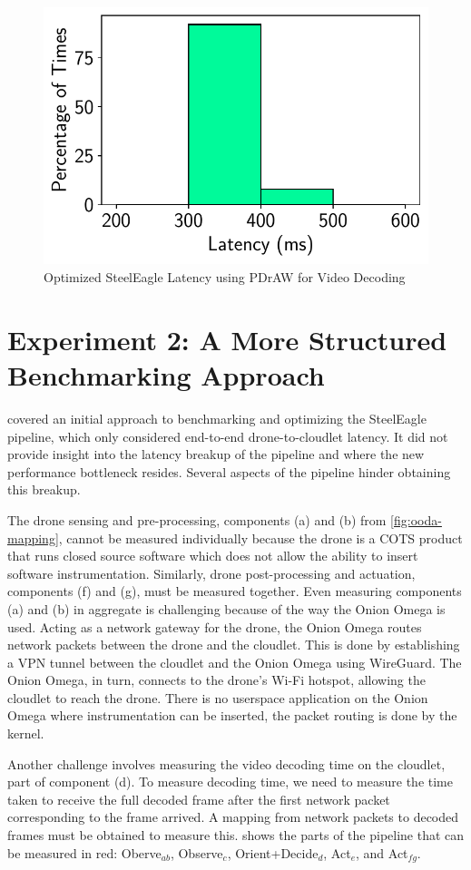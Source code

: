 \begin{figure}[htbp]
\centerline{\includegraphics[width = .4\textwidth]{figs/pdraw_latency.pdf}}
\caption{Optimized SteelEagle Latency using PDrAW for Video Decoding}
\label{fig:steeleagle_optimized_latency}
\end{figure}

\section{Experiment 2: A More Structured Benchmarking Approach}
\label{sec:exp2}

 covered an initial approach to benchmarking and optimizing the
SteelEagle pipeline, which only considered end-to-end drone-to-cloudlet
latency. It did not provide insight into the latency breakup of the pipeline
and where the new performance bottleneck resides. Several aspects of the
pipeline hinder obtaining this breakup.

The drone sensing and pre-processing, components (a) and (b) from
\cref{fig:ooda-mapping}, cannot be measured individually because the drone is a
COTS product that runs closed source software which does not allow the ability
to insert software instrumentation.  Similarly, drone post-processing and
actuation, components (f) and (g), must be measured together. Even measuring
components (a) and (b) in aggregate is challenging because of the way the Onion
Omega is used. Acting as a network gateway for the drone, the Onion Omega
routes network packets between the drone and the cloudlet. This is done by
establishing a VPN tunnel between the cloudlet and the Onion Omega using
WireGuard. The Onion Omega, in turn, connects to the drone's Wi-Fi hotspot,
allowing the cloudlet to reach the drone. There is no userspace application on
the Onion Omega where instrumentation can be inserted, the packet routing is
done by the kernel.

Another challenge involves measuring the video decoding time on the cloudlet,
part of component (d).  To measure decoding time, we need to measure the time
taken to receive the full decoded frame after the first network packet
corresponding to the frame arrived. A mapping from network packets to decoded
frames must be obtained to measure this.  shows the
parts of the pipeline that can be measured in red: Oberve$_{ab}$, Observe$_c$,
Orient+Decide$_d$, Act$_e$, and Act$_{fg}$.

